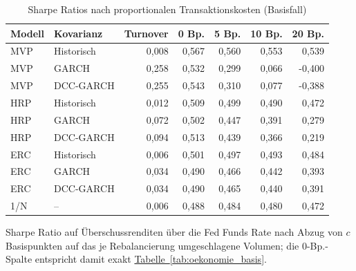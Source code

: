 \begin{table}[htbp]
  \centering
  \footnotesize
  \begin{tabular}{llrrrrr}
    \toprule
    Modell & Kovarianz & Turnover & 0 Bp. & 5 Bp. & 10 Bp. & 20 Bp. \\
    \midrule
    MVP & Historisch & 0,008 & 0,567 & 0,560 & 0,553 & 0,539 \\
    MVP & GARCH & 0,258 & 0,532 & 0,299 & 0,066 & -0,400 \\
    MVP & DCC-GARCH & 0,255 & 0,543 & 0,310 & 0,077 & -0,388 \\
    \midrule
    HRP & Historisch & 0,012 & 0,509 & 0,499 & 0,490 & 0,472 \\
    HRP & GARCH & 0,072 & 0,502 & 0,447 & 0,391 & 0,279 \\
    HRP & DCC-GARCH & 0,094 & 0,513 & 0,439 & 0,366 & 0,219 \\
    \midrule
    ERC & Historisch & 0,006 & 0,501 & 0,497 & 0,493 & 0,484 \\
    ERC & GARCH & 0,034 & 0,490 & 0,466 & 0,442 & 0,393 \\
    ERC & DCC-GARCH & 0,034 & 0,490 & 0,465 & 0,440 & 0,391 \\
    \midrule
    1/N & -- & 0,006 & 0,488 & 0,484 & 0,480 & 0,472 \\
    \bottomrule
  \end{tabular}
  \caption{Sharpe Ratios nach proportionalen Transaktionskosten (Basisfall)}
  \label{tab:transaktionskosten}
  \begin{minipage}{\linewidth}\vspace{0.4em}\centering\footnotesize
  Sharpe Ratio auf Überschussrenditen über die Fed Funds Rate nach Abzug von $c$ Basispunkten auf das je Rebalancierung umgeschlagene Volumen; die 0-Bp.-Spalte entspricht damit exakt \hyperref[tab:oekonomie_basis]{Tabelle~\ref*{tab:oekonomie_basis}}.
  \end{minipage}
\end{table}

